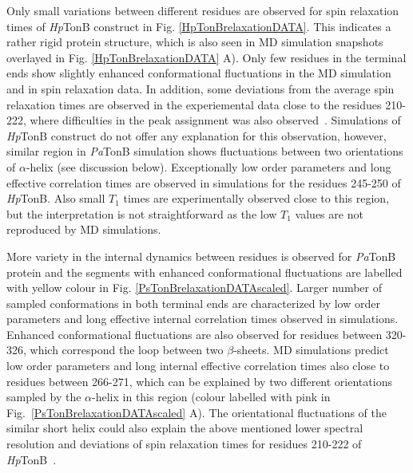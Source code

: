 \documentclass[pre,aps,floatfix,authordate1-4,twocolumn]{revtex4-1}
\begin{document}
Only small variations between different residues are observed
for spin relaxation times of {\it Hp}TonB construct in Fig. \ref{HpTonBrelaxationDATA}.
This indicates a rather rigid protein structure, which is also seen in
MD simulation snapshots overlayed in Fig. \ref{HpTonBrelaxationDATA} A).
Only few residues in the terminal ends show slightly
enhanced conformational fluctuations in the MD simulation and in
spin relaxation data. In addition, some deviations from the average spin relaxation times
are observed in the experiemental data close to the residues 210-222, where  
difficulties in the peak assignment was also observed~\cite{ciragan16}.
Simulations of {\it Hp}TonB construct do not offer any explanation for this
observation, however, similar region in {\it Pa}TonB simulation shows 
fluctuations between two orientations of $\alpha$-helix (see discussion below).
Exceptionally low order parameters and long effective correlation times 
are observed in simulations for the residues 245-250 of {\it Hp}TonB.
Also small $T_1$ times are experimentally observed close to this region,
but the interpretation is not straightforward as the low $T_1$ values 
are not reproduced by MD simulations.

More variety in the internal dynamics between residues is observed for {\it Pa}TonB
protein and the segments with enhanced conformational fluctuations are labelled with yellow colour
in Fig. \ref{PsTonBrelaxationDATAscaled}.
Larger number of sampled conformations in both terminal ends
are characterized by low order parameters and long effective internal correlation times
observed in simulations. 
Enhanced conformational fluctuations are also observed for residues between 320-326,
which correspond the loop between two $\beta$-sheets.
MD simulations predict low order parameters and long internal effective correlation
times also close to residues between 266-271, which can be explained by  
two different orientations sampled by the $\alpha$-helix in this region
(colour labelled with pink in Fig.~\ref{PsTonBrelaxationDATAscaled} A).
The orientational fluctuations of the similar short helix could also explain the above mentioned
lower spectral resolution and deviations of spin relaxation times
for residues 210-222 of {\it Hp}TonB~\cite{ciragan16}.
\end{document}
